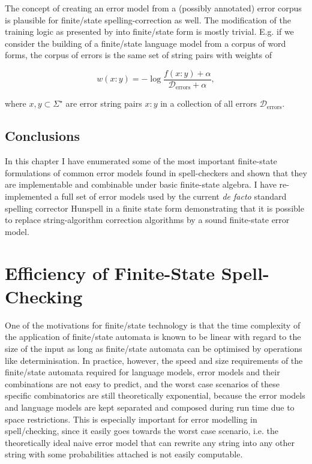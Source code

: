 \documentclass[officiallayout,final]{unihelcompling}
\begin{document}
The concept of creating an error model from a (possibly annotated) error corpus
is plausible for finite\-/state spelling-correction as well. The modification
of the training logic as presented by \citet{church1991probability} into
finite\-/state form is mostly trivial. E.g. if we consider the building of a
finite\-/state language model from a corpus of word forms, the corpus of errors
is the same set of string pairs with weights of 

\begin{equation}
    w(x:y) = -\log\frac{f(x:y) + \alpha}{\mathcal{D}_\mathrm{errors} + \alpha},
\end{equation}

where $x, y \subset \Sigma^\star$ are error string pairs $x:y$ in a collection
of all errors $\mathcal{D}_\mathrm{errors}$.

\section{Conclusions}

In this chapter I have enumerated some of the most important finite-state
formulations of common error models found in spell-checkers and shown that they
are implementable and combinable under basic finite-state algebra. I have
re-implemented a full set of error models used by the current \emph{de facto}
standard spelling corrector Hunspell in a finite state form demonstrating that
it is possible to replace string-algorithm correction algorithms by a sound
finite-state error model.

\chapter{Efficiency of Finite-State Spell-Checking}
\label{chap:efficiency}

One of the motivations for finite\-/state technology is that the time
complexity of the application of finite\-/state automata is known to be linear
with regard to the size of the input as long as finite\-/state automata can be
optimised by operations like determinisation. In practice, however, the speed
and size requirements of the finite\-/state automata required for language
models, error models and their combinations are not easy to predict, and the
worst case scenarios of these specific combinatorics are still theoretically
exponential, because the error models and language models are kept separated
and composed during run time due to space restrictions. This is especially
important for error modelling in spell\-/checking, since it easily goes towards
the worst case scenario, i.e. the theoretically ideal naive error model that
can rewrite any string into any other string with some probabilities attached
is not easily computable.
\end{document}
